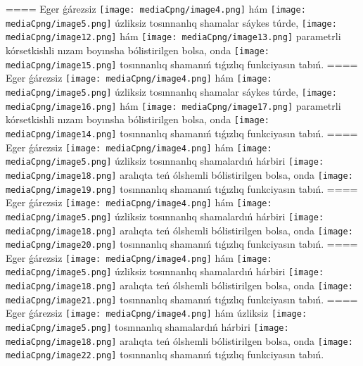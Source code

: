 ====
Eger ǵárezsiz \texttt{[image: mediaCpng/image4.png]} hám \texttt{[image: mediaCpng/image5.png]} úzliksiz tosınnanlıq shamalar sáykes túrde, \texttt{[image: mediaCpng/image12.png]} hám \texttt{[image: mediaCpng/image13.png]} parametrli kórsetkishli nızam boyınsha bólistirilgen bolsa, onda \texttt{[image: mediaCpng/image15.png]} tosınnanlıq shamanıń tıǵızlıq funkciyasın tabıń.
====
Eger ǵárezsiz \texttt{[image: mediaCpng/image4.png]} hám \texttt{[image: mediaCpng/image5.png]} úzliksiz tosınnanlıq shamalar sáykes túrde, \texttt{[image: mediaCpng/image16.png]} hám \texttt{[image: mediaCpng/image17.png]} parametrli kórsetkishli nızam boyınsha bólistirilgen bolsa, onda \texttt{[image: mediaCpng/image14.png]} tosınnanlıq shamanıń tıǵızlıq funkciyasın tabıń.
====
Eger ǵárezsiz \texttt{[image: mediaCpng/image4.png]} hám \texttt{[image: mediaCpng/image5.png]} úzliksiz tosınnanlıq shamalardıń hárbiri \texttt{[image: mediaCpng/image18.png]} aralıqta teń ólshemli bólistirilgen bolsa, onda \texttt{[image: mediaCpng/image19.png]} tosınnanlıq shamanıń tıǵızlıq funkciyasın tabıń.
====
Eger ǵárezsiz \texttt{[image: mediaCpng/image4.png]} hám \texttt{[image: mediaCpng/image5.png]} úzliksiz tosınnanlıq shamalardıń hárbiri \texttt{[image: mediaCpng/image18.png]} aralıqta teń ólshemli bólistirilgen bolsa, onda \texttt{[image: mediaCpng/image20.png]} tosınnanlıq shamanıń tıǵızlıq funkciyasın tabıń.
====
Eger ǵárezsiz \texttt{[image: mediaCpng/image4.png]} hám \texttt{[image: mediaCpng/image5.png]} úzliksiz tosınnanlıq shamalardıń hárbiri \texttt{[image: mediaCpng/image18.png]} aralıqta teń ólshemli bólistirilgen bolsa, onda \texttt{[image: mediaCpng/image21.png]} tosınnanlıq shamanıń tıǵızlıq funkciyasın tabıń.
====
Eger ǵárezsiz \texttt{[image: mediaCpng/image4.png]} hám úzliksiz \texttt{[image: mediaCpng/image5.png]} tosınnanlıq shamalardıń hárbiri \texttt{[image: mediaCpng/image18.png]} aralıqta teń ólshemli bólistirilgen bolsa, onda \texttt{[image: mediaCpng/image22.png]} tosınnanlıq shamanıń tıǵızlıq funkciyasın tabıń.
